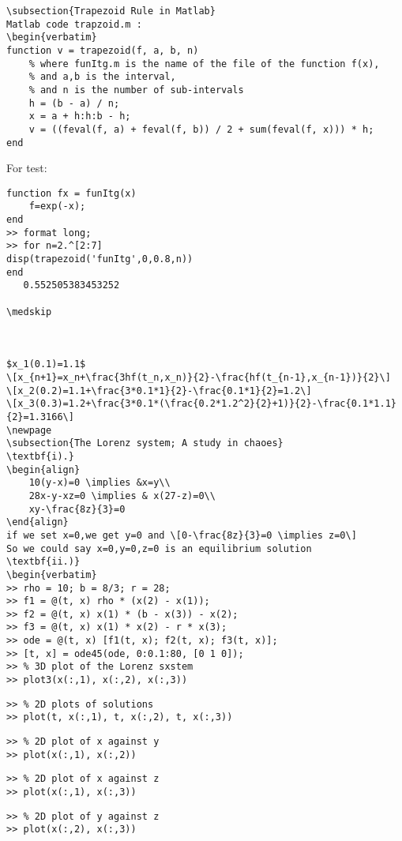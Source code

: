 \begin{verbatim}
\subsection{Trapezoid Rule in Matlab}
Matlab code trapzoid.m :
\begin{verbatim}
function v = trapezoid(f, a, b, n)
    % where funItg.m is the name of the file of the function f(x), 
    % and a,b is the interval, 
    % and n is the number of sub-intervals
    h = (b - a) / n;
    x = a + h:h:b - h;
    v = ((feval(f, a) + feval(f, b)) / 2 + sum(feval(f, x))) * h;
end
\end{verbatim}
For test:
\begin{verbatim}
function fx = funItg(x)
    f=exp(-x);
end
>> format long;
>> for n=2.^[2:7]
disp(trapezoid('funItg',0,0.8,n))
end
   0.552505383453252

\medskip



$x_1(0.1)=1.1$
\[x_{n+1}=x_n+\frac{3hf(t_n,x_n)}{2}-\frac{hf(t_{n-1},x_{n-1})}{2}\]
\[x_2(0.2)=1.1+\frac{3*0.1*1}{2}-\frac{0.1*1}{2}=1.2\]
\[x_3(0.3)=1.2+\frac{3*0.1*(\frac{0.2*1.2^2}{2}+1)}{2}-\frac{0.1*1.1}{2}=1.3166\]
\newpage
\subsection{The Lorenz system; A study in chaoes}
\textbf{i).}
\begin{align}
    10(y-x)=0 \implies &x=y\\
    28x-y-xz=0 \implies & x(27-z)=0\\
    xy-\frac{8z}{3}=0
\end{align}
if we set x=0,we get y=0 and \[0-\frac{8z}{3}=0 \implies z=0\]
So we could say x=0,y=0,z=0 is an equilibrium solution
\textbf{ii.)}
\begin{verbatim}
>> rho = 10; b = 8/3; r = 28;
>> f1 = @(t, x) rho * (x(2) - x(1));
>> f2 = @(t, x) x(1) * (b - x(3)) - x(2);
>> f3 = @(t, x) x(1) * x(2) - r * x(3);
>> ode = @(t, x) [f1(t, x); f2(t, x); f3(t, x)];
>> [t, x] = ode45(ode, 0:0.1:80, [0 1 0]);
>> % 3D plot of the Lorenz sxstem
>> plot3(x(:,1), x(:,2), x(:,3))
\end{verbatim}
\begin{verbatim}
>> % 2D plots of solutions
>> plot(t, x(:,1), t, x(:,2), t, x(:,3))
\end{verbatim}
\begin{verbatim}
>> % 2D plot of x against y
>> plot(x(:,1), x(:,2))
\end{verbatim}
\begin{verbatim}
>> % 2D plot of x against z
>> plot(x(:,1), x(:,3))
\end{verbatim}
\begin{verbatim}
>> % 2D plot of y against z
>> plot(x(:,2), x(:,3))
\end{verbatim}
\newpage
